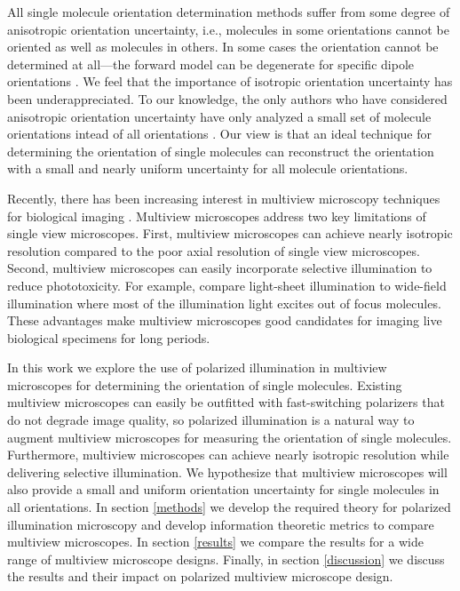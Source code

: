 \documentclass[10pt]{article}
\begin{document}
All single molecule orientation determination methods suffer from some degree of
anisotropic orientation uncertainty, i.e., molecules in some orientations
cannot be oriented as well as molecules in others. In some cases the
orientation cannot be determined at all---the forward model can be degenerate
for specific dipole orientations \cite{fourkas2001, lu2008}. We feel that the
importance of isotropic orientation uncertainty has been underappreciated. To
our knowledge, the only authors who have considered anisotropic orientation
uncertainty have only analyzed a small set of molecule orientations intead of
all orientations \cite{agrawal2012}. Our view is that an ideal technique for
determining the orientation of single molecules can reconstruct the
orientation with a small and nearly uniform uncertainty for all molecule
orientations.

Recently, there has been increasing interest in multiview microscopy techniques
for biological imaging \cite{wu2013, keller2015, wu2016, wu2017}. Multiview
microscopes address two key limitations of single view microscopes. First,
multiview microscopes can achieve nearly isotropic resolution compared to the
poor axial resolution of single view microscopes. Second, multiview microscopes
can easily incorporate selective illumination to reduce phototoxicity. For
example, compare light-sheet illumination to wide-field illumination where
most of the illumination light excites out of focus molecules. These
advantages make multiview microscopes good candidates for imaging live
biological specimens for long periods.

In this work we explore the use of polarized illumination in multiview
microscopes for determining the orientation of single molecules. Existing
multiview microscopes can easily be outfitted with fast-switching polarizers
that do not degrade image quality, so polarized illumination is a natural way to
augment multiview microscopes for measuring the orientation of single
molecules. Furthermore, multiview microscopes can achieve nearly isotropic
resolution while delivering selective illumination. We hypothesize that
multiview microscopes will also provide a small and uniform orientation
uncertainty for single molecules in all orientations. In section \ref{methods}
we develop the required theory for polarized illumination microscopy and develop
information theoretic metrics to compare multiview microscopes. In section
\ref{results} we compare the results for a wide range of multiview microscope
designs. Finally, in section \ref{discussion} we discuss the results and their
impact on polarized multiview microscope design.
\end{document}
